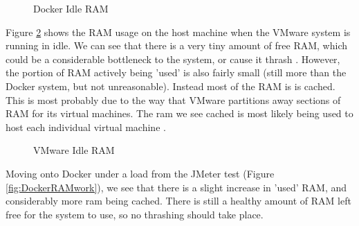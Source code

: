 \begin{figure}[H]
\caption{Docker Idle RAM}
\label{fig:DockerRAMidle}
\centering
\end{figure}

Figure \ref{fig:VMwareRAMidle} shows the RAM usage on the host machine when the VMware system is running in idle. We can see that there is a very tiny amount of free RAM, which could be a considerable bottleneck to the system, or cause it thrash \citep{thrashing}. However, the portion of RAM actively being 'used' is also fairly small (still more than the Docker system, but not unreasonable). Instead most of the RAM is is cached. This is most probably due to the way that VMware partitions away sections of RAM for its virtual machines. The ram we see cached is most likely being used to host each individual virtual machine .

\begin{figure}[H]
\caption{VMware Idle RAM}
\label{fig:VMwareRAMidle}
\centering
\end{figure}

Moving onto Docker under a load from the JMeter test (Figure \ref{fig:DockerRAMwork}), we see that there is a slight increase in 'used' RAM, and considerably more ram being cached. There is still a healthy amount of RAM left free for the system to use, so no thrashing should take place.

